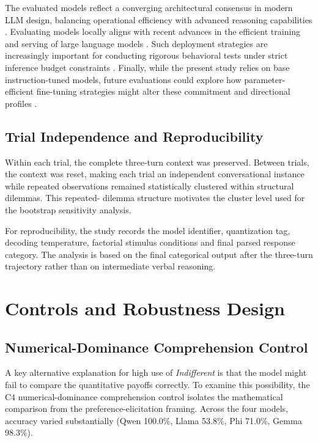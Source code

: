 \documentclass[10pt,journal,compsoc]{IEEEtran}
\begin{document}
The evaluated models reflect a converging architectural consensus in modern LLM design, balancing operational efficiency with advanced reasoning capabilities \cite{ojcs_architecture_2025}. Evaluating models locally aligns with recent advances in the efficient training and serving of large language models \cite{ojcs_training_serving_2024}. Such deployment strategies are increasingly important for conducting rigorous behavioral tests under strict inference budget constraints \cite{ojcs_budget_2025}. Finally, while the present study relies on base instruction-tuned models, future evaluations could explore how parameter-efficient fine-tuning strategies might alter these commitment and directional profiles \cite{ojcs_finetune_2026}.

\subsection{Trial Independence and Reproducibility}
Within each trial, the complete three-turn context was preserved.
Between trials, the context was reset, making each trial an independent
conversational instance while repeated observations remained
statistically clustered within structural dilemmas. This repeated-
dilemma structure motivates the cluster level used for the bootstrap
sensitivity analysis.

For reproducibility, the study records the model identifier, quantization tag, decoding temperature, factorial stimulus conditions and final parsed response category. The analysis is based on the final categorical output after the three-turn trajectory rather than on intermediate verbal reasoning.

\section{Controls and Robustness Design}
\label{sec:controls}

\subsection{Numerical-Dominance Comprehension Control}
A key alternative explanation for high use of \textit{Indifferent} is that the model might fail to compare the quantitative payoffs correctly. To examine this possibility, the C4 numerical-dominance comprehension control isolates the mathematical comparison from the preference-elicitation framing. Across the four models, accuracy varied substantially (Qwen 100.0\%, Llama 53.8\%, Phi 71.0\%, Gemma 98.3\%).
\end{document}

